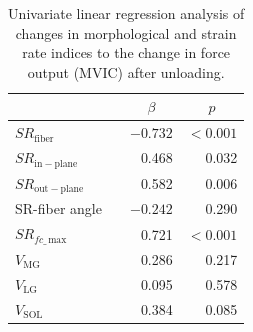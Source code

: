 \begin{table}[!htb]
\vspace{+0.2cm}
\caption[Univariate linear regression analysis of changes in morphological and strain rate indices to the change in force output after unloading]{Univariate linear regression analysis of changes in morphological and strain rate indices to the change in force output (MVIC) after unloading.}
\label{tab: SR1_4}
\begin{center}
\begin{tabular}{@{}lrrr@{}}
\toprule[1pt]\midrule[0.3pt] 
               &  & \multicolumn{1}{c}{$\beta$}      & \multicolumn{1}{c}{$p$}            \\ \midrule
$SR_{\mathrm{fiber}}$ 	 &  & $-0.732$    & $<0.001$    \\ [2pt]
$SR_{\mathrm{in-plane}}$  &  & 0.468     & 0.032              \\ [2pt]
$SR_{\mathrm{out-plane}}$ &  & 0.582     & 0.006              \\ [2pt]
SR-fiber angle 			 &  & $-0.242$    & 0.290              \\ [2pt]
$SR_{fc\_\,\mathrm{max}}$&  & 0.721     & $<0.001$   \\ [2pt]
$V_{\mathrm{MG}}$        &  & 0.286     & 0.217              \\ [2pt]
$V_{\mathrm{LG}}$ 		 &  & 0.095     & 0.578              \\ [2pt]
$V_{\mathrm{SOL}}$		 &  & 0.384     & 0.085              \\ \midrule[0.3pt]\bottomrule[1pt]

\end{tabular}
\end{center}
\vspace{-0.2cm}
\end{table}
